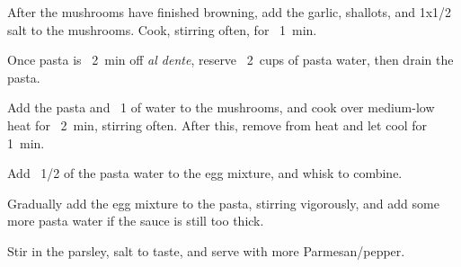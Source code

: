 \begin{recipe}
{		\step After the mushrooms have finished browning, add the garlic, shallots, and \SI{1x1/2}{\teaspoon} salt to the mushrooms. Cook, stirring often, for ~\SI{1}{\minute}.

		\step Once pasta is ~\SI{2}{\minute} off \textit{al dente}, reserve ~\SI{2}{cups} of pasta water, then drain the pasta.

		\step Add the pasta and ~\SI{1}{\cup} of water to the mushrooms, and cook over medium-low heat for ~\SI{2}{\minute}, stirring often. After this, remove from heat and let cool for \SI{1}{\minute}.

		\step Add ~\SI{1/2}{\cup} of the pasta water to the egg mixture, and whisk to combine.

		\vspace{1em}

		\step Gradually add the egg mixture to the pasta, stirring vigorously, and add some more pasta water if the sauce is still too thick.

		\step Stir in the parsley, salt to taste, and serve with more Parmesan/pepper.
	}

\end{recipe}
